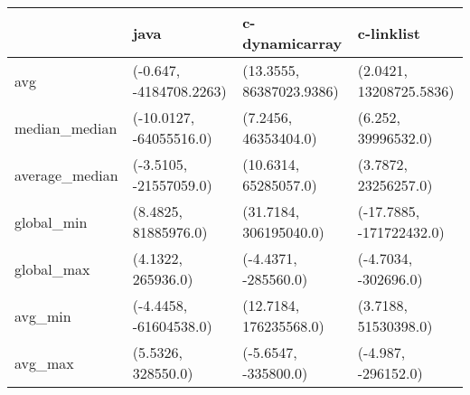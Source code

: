 \begin{tabular}{llll}
\toprule
{} &                     java &            c-dynamicarray &                c-linklist \\
\midrule
avg            &  (-0.647, -4184708.2263) &  (13.3555, 86387023.9386) &   (2.0421, 13208725.5836) \\
median\_median  &  (-10.0127, -64055516.0) &      (7.2456, 46353404.0) &       (6.252, 39996532.0) \\
average\_median &   (-3.5105, -21557059.0) &     (10.6314, 65285057.0) &      (3.7872, 23256257.0) \\
global\_min     &     (8.4825, 81885976.0) &    (31.7184, 306195040.0) &  (-17.7885, -171722432.0) \\
global\_max     &       (4.1322, 265936.0) &      (-4.4371, -285560.0) &      (-4.7034, -302696.0) \\
avg\_min        &   (-4.4458, -61604538.0) &    (12.7184, 176235568.0) &      (3.7188, 51530398.0) \\
avg\_max        &       (5.5326, 328550.0) &      (-5.6547, -335800.0) &       (-4.987, -296152.0) \\
\bottomrule
\end{tabular}

